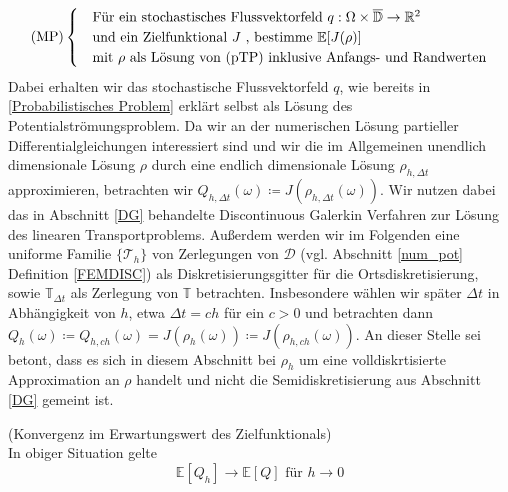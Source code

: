 \begin{align}
\text{(MP)}
\begin{cases}
\label{Modellproblem}
&\text{Für ein stochastisches Flussvektorfeld } q: \Omega \times \overline{\mathbb{D}} \to \mathbb{R}^2 \\
&\text{und ein Zielfunktional } J \text{ , bestimme }  \mathbb{E}[J(\rho)]  \\
&\text{mit } \rho \text{ als Lösung von (pTP) inklusive Anfangs- und Randwerten}
\end{cases}
\end{align} 
Dabei erhalten wir das stochastische Flussvektorfeld $ q $, wie bereits in \ref{Probabilistisches Problem} erklärt selbst als Lösung des Potentialströmungsproblem.
Da wir an der numerischen Lösung partieller Differentialgleichungen interessiert sind und wir die im Allgemeinen unendlich dimensionale Lösung $ \rho $ durch eine endlich dimensionale Lösung $ \rho_{h,\Delta t} $ approximieren, betrachten wir $ Q_{h,\Delta t}(\omega) \coloneqq J(\rho_{h,\Delta t}(\omega )) $.
Wir nutzen dabei das in Abschnitt \ref{DG} behandelte Discontinuous Galerkin Verfahren zur Lösung des linearen Transportproblems. Außerdem werden wir im Folgenden eine uniforme Familie $ \{ \mathcal{T}_h \} $ von Zerlegungen von $ \mathcal{D} $ (vgl. Abschnitt \ref{num_pot} Definition \ref{FEMDISC}) als Diskretisierungsgitter für die Ortsdiskretisierung, sowie $ \mathbb{T}_{\Delta t} $ als Zerlegung von $ \mathbb{T} $ betrachten.
Insbesondere wählen wir später $ \Delta t $ in Abhängigkeit von $ h $, etwa $ \Delta t = c  h $ für ein $ c>0 $ und betrachten dann
$ Q_h(\omega) \coloneqq Q_{h,ch}(\omega) = J(\rho_h(\omega )) \coloneqq J(\rho_{h,ch}(\omega )) $.
An dieser Stelle sei betont, dass es sich in diesem Abschnitt bei $ \rho_h $ um eine volldiskrtisierte Approximation an $ \rho $ handelt und nicht die Semidiskretisierung aus Abschnitt \ref{DG} gemeint ist.
\begin{Annahme}(Konvergenz im Erwartungswert des Zielfunktionals)\\
	In obiger Situation gelte 
	\[ 
	\mathbb{E}[Q_h] \to \mathbb{E}[Q] \text{ für } h \to 0   
	\]
\end{Annahme}


